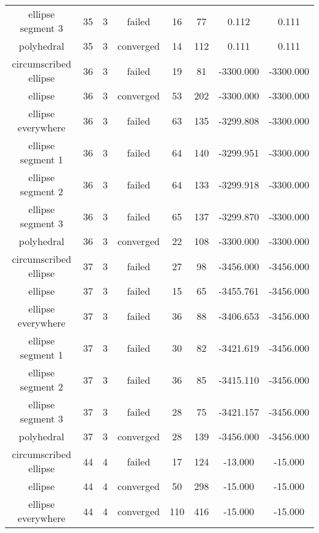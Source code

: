 \begin{scriptsize}
\begin{center}
\begin{longtable}{ c c c c c c c c }
    ellipse segment 3     &   35  &  3  &   failed   &   16  &   77  &   0.112    &   0.111    \\
        polyhedral        &   35  &  3  & converged  &   14  &  112  &   0.111    &   0.111    \\
  circumscribed ellipse   &   36  &  3  &   failed   &   19  &   81  & -3300.000  & -3300.000  \\
         ellipse          &   36  &  3  & converged  &   53  &  202  & -3300.000  & -3300.000  \\
    ellipse everywhere    &   36  &  3  &   failed   &   63  &  135  & -3299.808  & -3300.000  \\
    ellipse segment 1     &   36  &  3  &   failed   &   64  &  140  & -3299.951  & -3300.000  \\
    ellipse segment 2     &   36  &  3  &   failed   &   64  &  133  & -3299.918  & -3300.000  \\
    ellipse segment 3     &   36  &  3  &   failed   &   65  &  137  & -3299.870  & -3300.000  \\
        polyhedral        &   36  &  3  & converged  &   22  &  108  & -3300.000  & -3300.000  \\
  circumscribed ellipse   &   37  &  3  &   failed   &   27  &   98  & -3456.000  & -3456.000  \\
         ellipse          &   37  &  3  &   failed   &   15  &   65  & -3455.761  & -3456.000  \\
    ellipse everywhere    &   37  &  3  &   failed   &   36  &   88  & -3406.653  & -3456.000  \\
    ellipse segment 1     &   37  &  3  &   failed   &   30  &   82  & -3421.619  & -3456.000  \\
    ellipse segment 2     &   37  &  3  &   failed   &   36  &   85  & -3415.110  & -3456.000  \\
    ellipse segment 3     &   37  &  3  &   failed   &   28  &   75  & -3421.157  & -3456.000  \\
        polyhedral        &   37  &  3  & converged  &   28  &  139  & -3456.000  & -3456.000  \\
  circumscribed ellipse   &   44  &  4  &   failed   &   17  &  124  &  -13.000   &  -15.000   \\
         ellipse          &   44  &  4  & converged  &   50  &  298  &  -15.000   &  -15.000   \\
    ellipse everywhere    &   44  &  4  & converged  &  110  &  416  &  -15.000   &  -15.000   \\

\end{longtable}
\end{center}
\end{scriptsize}
